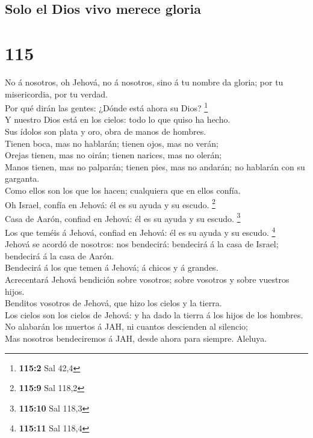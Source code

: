 \hypertarget{solo-el-dios-vivo-merece-gloria}{%
\subsection{Solo el Dios vivo merece
gloria}\label{solo-el-dios-vivo-merece-gloria}}

\hypertarget{section-114}{%
\section{115}\label{section-114}}

 No á nosotros, oh Jehová, no á nosotros, sino á tu nombre
da gloria; por tu misericordia, por tu verdad.\\
 Por qué dirán las gentes: ¿Dónde está ahora su Dios?
\footnote{\textbf{115:2} Sal 42,4}\\
 Y nuestro Dios está en los cielos: todo lo que quiso ha
hecho.\\
 Sus ídolos son plata y oro, obra de manos de hombres.\\
 Tienen boca, mas no hablarán; tienen ojos, mas no verán;\\
 Orejas tienen, mas no oirán; tienen narices, mas no
olerán;\\
 Manos tienen, mas no palparán; tienen pies, mas no andarán;
no hablarán con su garganta.\\
 Como ellos son los que los hacen; cualquiera que en ellos
confía.\\
 Oh Israel, confía en Jehová: él es su ayuda y su escudo.
\footnote{\textbf{115:9} Sal 118,2}\\
 Casa de Aarón, confiad en Jehová: él es su ayuda y su
escudo. \footnote{\textbf{115:10} Sal 118,3}\\
 Los que teméis á Jehová, confiad en Jehová: él es su ayuda
y su escudo. \footnote{\textbf{115:11} Sal 118,4}\\
 Jehová se acordó de nosotros: nos bendecirá: bendecirá á
la casa de Israel; bendecirá á la casa de Aarón.\\
 Bendecirá á los que temen á Jehová; á chicos y á
grandes.\\
 Acrecentará Jehová bendición sobre vosotros; sobre
vosotros y sobre vuestros hijos.\\
 Benditos vosotros de Jehová, que hizo los cielos y la
tierra.\\
 Los cielos son los cielos de Jehová: y ha dado la tierra á
los hijos de los hombres.\\
 No alabarán los muertos á JAH, ni cuantos descienden al
silencio;\\
 Mas nosotros bendeciremos á JAH, desde ahora para siempre.
Aleluya.

